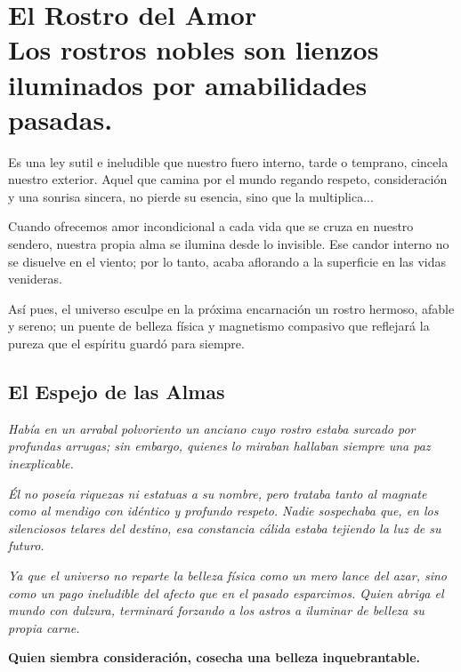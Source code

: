 \chapter[El Rostro del Amor]{El Rostro del Amor\\ \large Los rostros nobles son lienzos iluminados por amabilidades pasadas.}


\lettrine[lines=3, nindent=0.5em, findent=0.2em]{E}{}s una ley sutil e ineludible que nuestro fuero interno, tarde o temprano, cincela nuestro exterior. Aquel que camina por el mundo regando respeto, consideración y una sonrisa sincera, no pierde su esencia, sino que la multiplica...

Cuando ofrecemos amor incondicional a cada vida que se cruza en nuestro sendero, nuestra propia alma se ilumina desde lo invisible. Ese candor interno no se disuelve en el viento; por lo tanto, acaba aflorando a la superficie en las vidas venideras.

Así pues, el universo esculpe en la próxima encarnación un rostro hermoso, afable y sereno; un puente de belleza física y magnetismo compasivo que reflejará la pureza que el espíritu guardó para siempre.

\section{El Espejo de las Almas}
\begin{elegantquote}
\textit{Había en un arrabal polvoriento un anciano cuyo rostro estaba surcado por profundas arrugas; sin embargo, quienes lo miraban hallaban siempre una paz inexplicable.}

\textit{Él no poseía riquezas ni estatuas a su nombre, pero trataba tanto al magnate como al mendigo con idéntico y profundo respeto. Nadie sospechaba que, en los silenciosos telares del destino, esa constancia cálida estaba tejiendo la luz de su futuro.}

\textit{Ya que el universo no reparte la belleza física como un mero lance del azar, sino como un pago ineludible del afecto que en el pasado esparcimos. Quien abriga el mundo con dulzura, terminará forzando a los astros a iluminar de belleza su propia carne.}

\end{elegantquote}


\vspace{1em}
\begin{center}
    \textbf{\Large Quien siembra consideración, cosecha una belleza inquebrantable.}
\end{center}
\vspace{1em}

